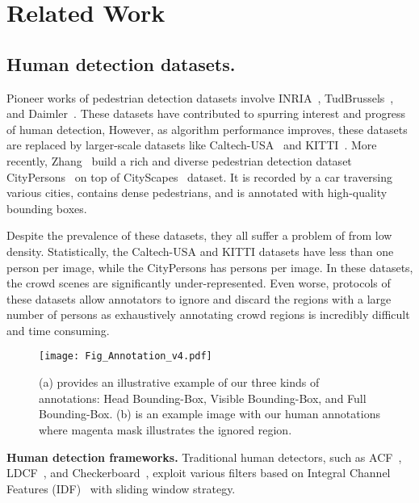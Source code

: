 \documentclass[10pt,twocolumn,letterpaper]{article}
\newcommand{\myparagraph}[1]{{\vspace{0.5em} \noindent \bf #1}}
\begin{document}
\section{Related Work}
\subsection{Human detection datasets.} 
Pioneer works of pedestrian detection datasets involve INRIA~\cite{dalal2005histograms}, TudBrussels~\cite{wojek2009multi}, and Daimler~\cite{enzweiler2009monocular}. These datasets have contributed to spurring interest and progress of human detection, However, as algorithm performance improves, these datasets are replaced by larger-scale datasets like Caltech-USA~\cite{dollar2009pedestrian} and KITTI~\cite{Geiger2012CVPR}. More recently, Zhang \etal~build a rich and diverse pedestrian detection dataset CityPersons~\cite{zhang2017citypersons} on top of CityScapes~\cite{cordts2016cityscapes} dataset. It is recorded by a car traversing various cities, contains dense pedestrians, and is annotated with high-quality bounding boxes. 

Despite the prevalence of these datasets, they all suffer a problem of from low density. Statistically, the Caltech-USA and KITTI datasets have less than one person per image, while the CityPersons has  persons per image. In these datasets, the crowd scenes are significantly under-represented. Even worse, protocols of these datasets allow annotators to ignore and discard the regions with a large number of persons as exhaustively annotating crowd regions is incredibly difficult and time consuming. 




\begin{figure*}
\centering
\texttt{[image: Fig\_Annotation\_v4.pdf]}
\caption{(a) provides an illustrative example of our three kinds of annotations: Head Bounding-Box, Visible Bounding-Box, and Full Bounding-Box. (b) is an example image with our human annotations where magenta mask illustrates the ignored region.}
\label{fig:annotation_example}
\end{figure*}

\myparagraph{Human detection frameworks.} 
Traditional human detectors, such as ACF~\cite{dollar2014fast}, LDCF~\cite{nam2014local}, and Checkerboard~\cite{zhang2015filtered}, exploit various filters based on Integral Channel Features (IDF)~\cite{dollar2009integral} with sliding window strategy. 
\end{document}
